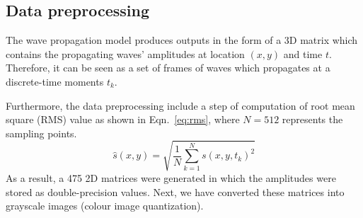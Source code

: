 \subsection{Data preprocessing}
The wave propagation model produces outputs in the form of a 3D matrix which contains the propagating waves' amplitudes at location \((x, y)\) and time \(t\). 
Therefore, it can be seen as a set of frames of waves which propagates at a discrete-time moments \(t_k\).

Furthermore, the data preprocessing include a step of computation of root mean square (RMS) value as shown in Eqn.~\ref{eq:rms}, where \(N=512\) represents the sampling points.
\begin{equation}
	\hat{s}(x,y) = \sqrt{\frac{1}{N}\sum_{k=1}^{N} s(x,y,t_k)^2}
	\label{eq:rms}
\end{equation}
As a result, a 475 2D matrices were generated in which the amplitudes were stored as double-precision values.
Next, we have converted these matrices into grayscale images (colour image quantization).

